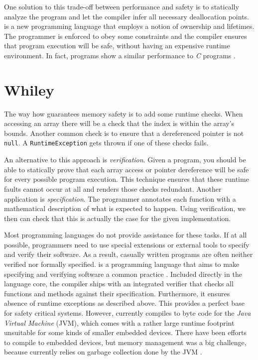 One solution to this trade-off between performance and safety is to statically analyze the program and let the compiler infer all necessary deallocation points.
\rust is a new programming language that employs a notion of ownership and lifetimes.
The programmer is enforced to obey some constraints and the compiler ensures that program execution will be safe, without having an expensive runtime environment.
In fact, \rust programs show a similar performance to \emph{C} programs \cite{RustBenchmarks}.


\section{Whiley}

The way how \java guarantees memory safety is to add some runtime checks.
When accessing an array there will be a check that the index is within the array's bounds.
Another common check is to ensure that a dereferenced pointer is not \texttt{null}.
A \texttt{RuntimeException} gets thrown if one of these checks fails.

An alternative to this approach is \emph{verification}.
Given a program, you should be able to statically prove that each array access or pointer dereference will be safe for every possible program execution.
This technique ensures that these runtime faults cannot occur at all and renders those checks redundant.
Another application is \emph{specification}.
The programmer annotates each function with a mathematical description of what is expected to happen.
Using verification, we then can check that this is actually the case for the given implementation.

Most programming languages do not provide assistance for these tasks.
If at all possible, programmers need to use special extensions or external tools to specify and verify their software.
As a result, casually written programs are often neither verified nor formally specified.
\whiley is a programming language that aims to make specifying and verifying software a common practice \cite{WLS}.
Included directly in the language core, the compiler ships with an integrated verifier that checks all functions and methods against their specification.
Furthermore, it ensures absence of runtime exceptions as described above.
This provides a perfect base for safety critical systems.
However, \whiley currently compiles to byte code for the \emph{Java Virtual Machine} (JVM), which comes with a rather large runtime footprint unsuitable for some kinds of smaller embedded devices.
There have been efforts to compile \whiley to embedded devices, but memory management was a big challenge, because \whiley currently relies on garbage collection done by the JVM \cite{Matt, IntegerRangeAnalysis}.


